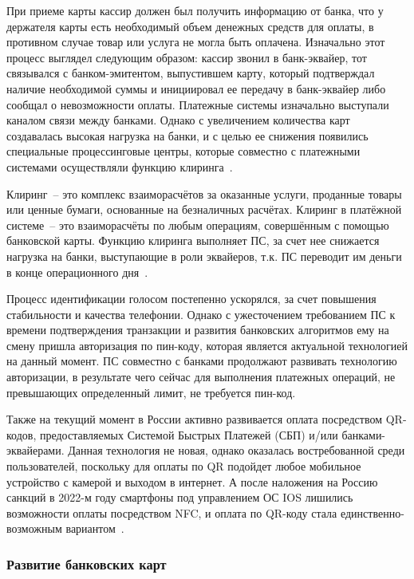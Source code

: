 При приеме карты кассир должен был получить информацию от банка, что у держателя карты есть необходимый объем денежных средств для оплаты, в противном случае товар или услуга не могла быть оплачена.
Изначально этот процесс выглядел следующим образом: кассир звонил в банк-эквайер, тот связывался с банком-эмитентом, выпустившем карту, который подтверждал наличие необходимой суммы и инициировал ее передачу в банк-эквайер либо сообщал о невозможности оплаты.
Платежные системы изначально выступали каналом связи между банками.
Однако с увеличением количества карт создавалась высокая нагрузка на банки, и с целью ее снижения появились специальные процессинговые центры, которые совместно с платежными системами осуществляли функцию клиринга~\cite{habr_fondy_payment_history}.

Клиринг~-- это комплекс взаиморасчётов за оказанные услуги, проданные товары или ценные бумаги, основанные на безналичных расчётах.
Клиринг в платёжной системе~-- это взаиморасчёты по любым операциям, совершённым с помощью банковской карты.
Функцию клиринга выполняет ПС, за счет нее снижается нагрузка на банки, выступающие в роли эквайеров, т.к. ПС переводит им деньги в конце операционного дня~\cite{habr_nspk_cliring}.

Процесс идентификации голосом постепенно ускорялся, за счет повышения стабильности и качества телефонии.
Однако с ужесточением требованием ПС к времени подтверждения транзакции и развития банковских алгоритмов ему на смену пришла авторизация по пин-коду, которая является актуальной технологией на данный момент.
ПС совместно с банками продолжают развивать технологию авторизации, в результате чего сейчас для выполнения платежных операций, не превышающих определенный лимит, не требуется пин-код.

Также на текущий момент в России активно развивается оплата посредством QR-кодов, предоставляемых Системой Быстрых Платежей (СБП) и/или банками-эквайерами.
Данная технология не новая, однако оказалась востребованной среди пользователей, поскольку для оплаты по QR подойдет любое мобильное устройство с камерой и выходом в интернет. 
А после наложения на Россию санкций в 2022-м году смартфоны под управлением ОС IOS лишились возможности оплаты посредством NFC, и оплата по QR-коду стала единственно-возможным вариантом~\cite{habr_nspk_qr}.


\subsubsection{Развитие банковских карт}

